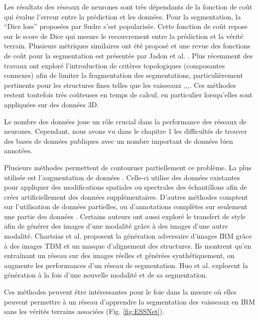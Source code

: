      Les résultats des réseaux de neurones sont très dépendants de la fonction de coût qui évalue l'erreur entre la prédiction et les données. Pour la segmentation, la ``Dice loss'' proposées par Sudre \cite{Sudre2017_DiceLoss} s'est popularisée. Cette fonction de coût repose sur le score de Dice qui mesure le recouvrement entre la prédiction et la vérité terrain. Plusieurs métriques similaires ont été proposé et une revue des fonctions de coût pour la segmentation est présentée par Jadon et al. \cite{Jadon2020_survey_seg_loss}. Plus récemment des travaux ont exploré l'introduction de critères topologiques (composantes connexes) afin de limiter la fragmentation des segmentations, particulièrement pertinents pour les structures fines telles que les vaisseaux \cite{Ventura2017iterative_topo},\cite{Hu2019_topo_homo_persi},\cite{Clough2019_topo_homo_persi},. Ces méthodes restent toutefois très coûteuses en temps de calcul, en particulier lorsqu'elles sont appliquées sur des données 3D. 

      Le nombre des données joue un rôle crucial dans la performance des réseaux de neurones. Cependant, nous avons vu dans le chapitre 1 les difficultés de trouver des bases de données publiques avec un nombre important de données bien annotées. 

      Plusieurs méthodes permettent de contourner partiellement ce problème. La plus utilisée est l'augmentation de données \cite{Liskowski2016_data_augmentation}. Celle-ci utilise des données existantes pour appliquer des modifications spatiales ou spectrales des échantillons afin de créer artificiellement des données supplémentaires. D'autres méthodes comptent sur l'utilisation de données partielles, ou d'annotations complètes sur seulement une partie des données \cite{Tajbakhsh2020_imperfect_datasets}. Certains auteurs ont aussi exploré le transfert de style afin de générer des images d'une modalité grâce à des images d'une autre modalité. Chartsias et al. \cite{Chartsias2017_heart_adversarial_im} proposent la génération adversaire d'images IRM grâce à des images TDM et un masque d'alignement des structures. Ils montrent qu'en entraînant un réseau sur des images réelles et générées synthétiquement, on augmente les performances d'un réseau de segmentation. Huo et al. \cite{Huo2018_adversarial} explorent la génération à la fois d'une nouvelle modalité et de sa segmentation.

      Ces méthodes peuvent être intéressantes pour le foie dans la mesure où elles peuvent permettre à un réseau d'apprendre la segmentation des vaisseaux en IRM sans les vérités terrains associées (Fig. \ref{fig:ESSNet}).

